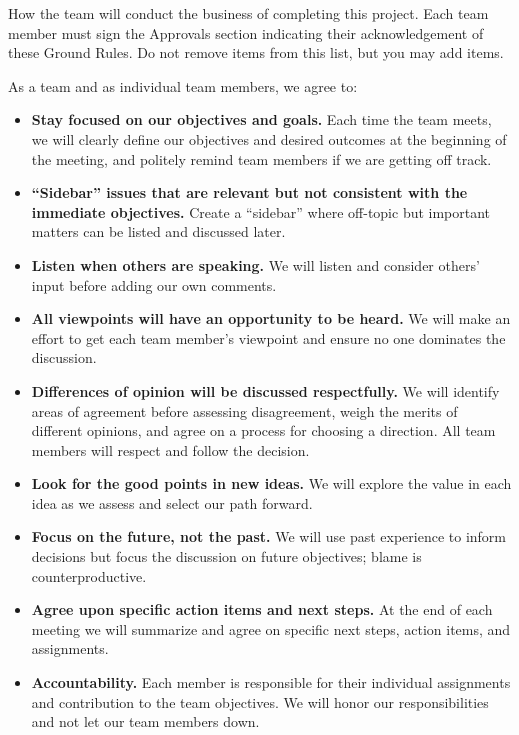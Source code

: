 \documentclass[11pt]{article}
\begin{document}
\begin{guidance}
How the team will conduct the business of completing this project. Each team member must sign the Approvals section indicating their acknowledgement of these Ground Rules. Do not remove items from this list, but you may add items.
\end{guidance}

\noindent As a team and as individual team members, we agree to:
\begin{itemize}[leftmargin=1.4em]
  \item \textbf{Stay focused on our objectives and goals.} Each time the team meets, we will clearly define our objectives and desired outcomes at the beginning of the meeting, and politely remind team members if we are getting off track.
  \item \textbf{``Sidebar'' issues that are relevant but not consistent with the immediate objectives.} Create a ``sidebar'' where off-topic but important matters can be listed and discussed later.
  \item \textbf{Listen when others are speaking.} We will listen and consider others' input before adding our own comments.
  \item \textbf{All viewpoints will have an opportunity to be heard.} We will make an effort to get each team member's viewpoint and ensure no one dominates the discussion.
  \item \textbf{Differences of opinion will be discussed respectfully.} We will identify areas of agreement before assessing disagreement, weigh the merits of different opinions, and agree on a process for choosing a direction. All team members will respect and follow the decision.
  \item \textbf{Look for the good points in new ideas.} We will explore the value in each idea as we assess and select our path forward.
  \item \textbf{Focus on the future, not the past.} We will use past experience to inform decisions but focus the discussion on future objectives; blame is counterproductive.
  \item \textbf{Agree upon specific action items and next steps.} At the end of each meeting we will summarize and agree on specific next steps, action items, and assignments.
  \item \textbf{Accountability.} Each member is responsible for their individual assignments and contribution to the team objectives. We will honor our responsibilities and not let our team members down.
\end{itemize}
\end{document}
